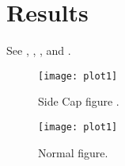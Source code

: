 \section{Results} \label{sec:Results}

\lipsum[17]

See , , ,  and .

\begin{SCfigure}[0.75][h!tb]
        \centering
                \texttt{[image: plot1]}
				\caption{Side Cap figure \capunit{\celsius}.
				\label{fig:plot1SC}}
\end{SCfigure}

\lipsum[18]






\lipsum[18]



\begin{figure}[h!tb]
        \centering
        \texttt{[image: plot1]}   
	\caption{Normal figure. \label{fig:plot1N}}
\end{figure}


\lipsum[19]

